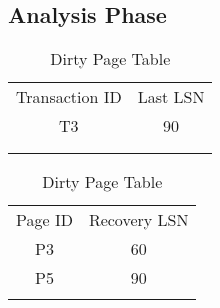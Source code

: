 \subsection{Analysis Phase}
\begin{table}[H]
    \begin{minipage}{.5\linewidth}
      \centering
		\begin{tabular}{|c|c|}
		\cline{1-2}
		Transaction ID & Last LSN \\ \cline{1-2}
		T3             & 90       \\ \cline{1-2}
		               &          \\ \cline{1-2}
		               &          \\ \cline{1-2}
		\end{tabular}
      \caption{Transaction Table}

    \end{minipage}%
    \begin{minipage}{.5\linewidth}
      \centering
		\begin{tabular}{|c|c|}
		\cline{1-2}
		Page ID & Recovery LSN \\ \cline{1-2}
		P3      & 60           \\ \cline{1-2}
		P5      & 90           \\ \cline{1-2}
		        &              \\ \cline{1-2}
		\end{tabular}
        \caption{Dirty Page Table}

    \end{minipage} 
\end{table}


